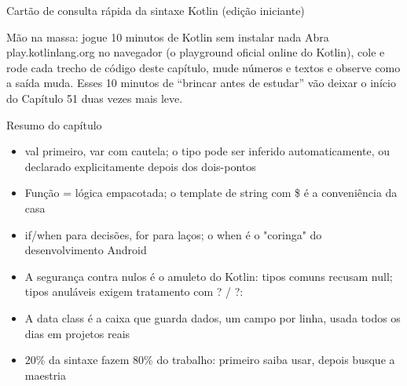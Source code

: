 \begin{center}\small\color{gray}Cartão de consulta rápida da sintaxe Kotlin (edição iniciante)\end{center}

\begin{tcbpractice}{Mão na massa: jogue 10 minutos de Kotlin sem instalar nada}
Abra play.kotlinlang.org no navegador (o playground oficial online do Kotlin), cole e rode cada trecho de código deste capítulo, mude números e textos e observe como a saída muda. Esses 10 minutos de “brincar antes de estudar” vão deixar o início do Capítulo 51 duas vezes mais leve.

\end{tcbpractice}

\begin{tcbsummary}{Resumo do capítulo}
\begin{itemize}
  \item val primeiro, var com cautela; o tipo pode ser inferido automaticamente, ou declarado explicitamente depois dos dois-pontos
  \item Função = lógica empacotada; o template de string com \$ é a conveniência da casa
  \item if/when para decisões, for para laços; o when é o "coringa" do desenvolvimento Android
  \item A segurança contra nulos é o amuleto do Kotlin: tipos comuns recusam null; tipos anuláveis exigem tratamento com ? / ?:
  \item A data class é a caixa que guarda dados, um campo por linha, usada todos os dias em projetos reais
  \item 20\% da sintaxe fazem 80\% do trabalho: primeiro saiba usar, depois busque a maestria
\end{itemize}

\end{tcbsummary}
